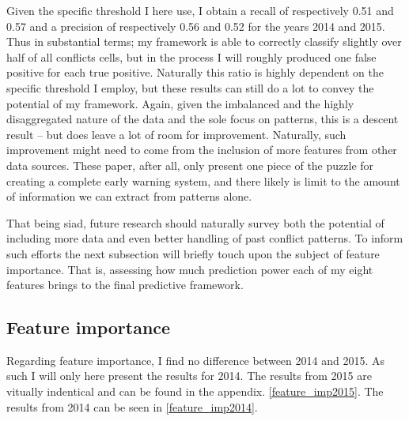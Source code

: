 \documentclass[a4paper]{article}
\begin{document}
Given the specific threshold I here use, I obtain a recall of respectively 0.51 and 0.57 and a precision of respectively 0.56 and 0.52 for the years 2014 and 2015. Thus in substantial terms; my framework is able to correctly classify slightly over half of all conflicts cells, but in the process I will roughly produced one false positive for each true positive. Naturally this ratio is highly dependent on the specific threshold I employ, but these results can still do a lot to convey the potential of my framework. Again, given the imbalanced and the highly disaggregated nature of the data and the sole focus on patterns, this is a descent result -- but does leave a lot of room for improvement. Naturally, such improvement might need to come from the inclusion of more features from other data sources. These paper, after all, only present one piece of the puzzle for creating a complete early warning system, and there likely is limit to the amount of information we can extract from patterns alone.\par

That being siad, future research should naturally survey both the potential of including more data and even better handling of past conflict patterns. To inform such efforts the next subsection will briefly touch upon the subject of feature importance. That is, assessing how much prediction power each of my eight features brings to the final predictive framework.\par 


\subsection{Feature importance}

Regarding feature importance, I find no difference between 2014 and 2015. As such I will only here present the results for 2014. The results from 2015 are vitually indentical and can be found in the appendix. \autoref{feature_imp2015}. The results from 2014 can be seen in \autoref{feature_imp2014}.\par 
\end{document}
